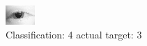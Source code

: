 \begin{figure}[h!]
\begin{center}
\includegraphics[width=0.60\columnwidth]{figures/ID97_class_4_target_3.png}
\end{center}
\caption{ Classification: 4 actual target: 3}
\label{fig:ID97_class_4_target_3}
\end{figure}
